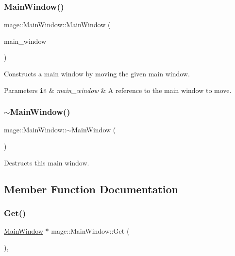 \subsubsection{\texorpdfstring{Main\+Window()}{MainWindow()}\hspace{0.1cm}{\footnotesize\ttfamily [3/3]}}
{\footnotesize\ttfamily mage\+::\+Main\+Window\+::\+Main\+Window (\begin{DoxyParamCaption}\item[{\hyperlink{classmage_1_1_main_window}{Main\+Window} \&\&}]{main\+\_\+window }\end{DoxyParamCaption})\hspace{0.3cm}{\ttfamily [default]}}

Constructs a main window by moving the given main window.


\begin{DoxyParams}[1]{Parameters}
\mbox{\tt in}  & {\em main\+\_\+window} & A reference to the main window to move. \\
\hline
\end{DoxyParams}
\hypertarget{classmage_1_1_main_window_ada7ecf97d82ce08ba2f31f0afd891031}{}\label{classmage_1_1_main_window_ada7ecf97d82ce08ba2f31f0afd891031} 
\subsubsection{\texorpdfstring{$\sim$\+Main\+Window()}{~MainWindow()}}
{\footnotesize\ttfamily mage\+::\+Main\+Window\+::$\sim$\+Main\+Window (\begin{DoxyParamCaption}{ }\end{DoxyParamCaption})}

Destructs this main window. 

\subsection{Member Function Documentation}
\hypertarget{classmage_1_1_main_window_ab670605775c88e0121afa7a52ac88ddf}{}\label{classmage_1_1_main_window_ab670605775c88e0121afa7a52ac88ddf} 
\subsubsection{\texorpdfstring{Get()}{Get()}}
{\footnotesize\ttfamily \hyperlink{classmage_1_1_main_window}{Main\+Window} $\ast$ mage\+::\+Main\+Window\+::\+Get (\begin{DoxyParamCaption}{ }\end{DoxyParamCaption})\hspace{0.3cm}{\ttfamily [static]}, {\ttfamily [noexcept]}}

